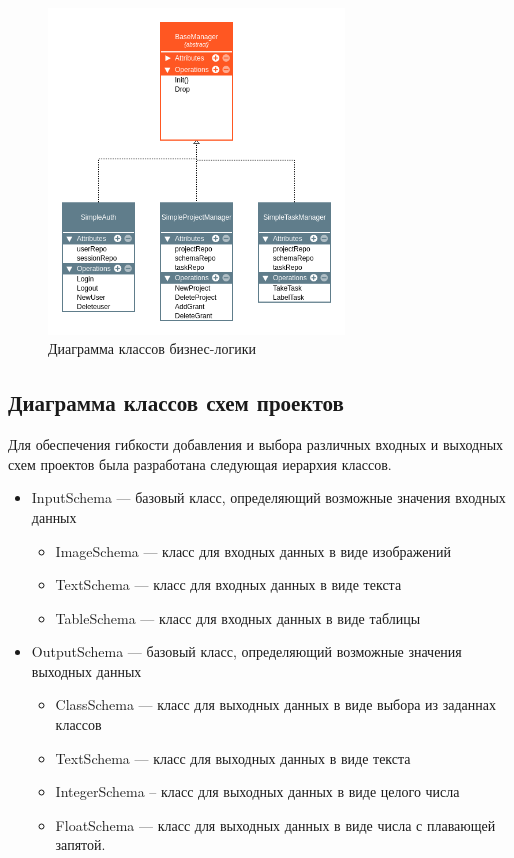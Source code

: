 \begin{figure}[h!]
    \includegraphics[width=0.7\textwidth]{./business.png}
    \caption{Диаграмма классов бизнес-логики}
\end{figure}

\subsection{Диаграмма классов схем проектов}

Для обеспечения гибкости добавления и выбора различных входных и выходных схем проектов была разработана следующая иерархия классов.

\begin{itemize}
    \item InputSchema --- базовый класс, определяющий возможные значения входных данных
    \begin{itemize} 
        \item ImageSchema --- класс для входных данных в виде изображений
        \item TextSchema --- класс для входных данных в виде текста
        \item TableSchema --- класс для входных данных в виде таблицы
    \end{itemize}
    \item OutputSchema --- базовый класс, определяющий возможные значения выходных данных
    \begin{itemize}
        \item ClassSchema --- класс для выходных данных в виде выбора из заданнах классов
        \item TextSchema --- класс для выходных данных в виде текста
        \item IntegerSchema -- класс для выходных данных в виде целого числа
        \item FloatSchema --- класс для выходных данных в виде числа с плавающей запятой.
    \end{itemize}
\end{itemize}

